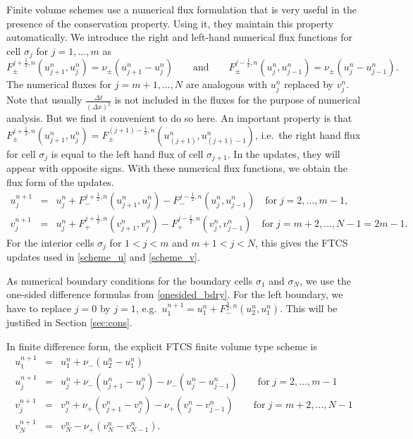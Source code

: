 Finite volume schemes use a numerical flux formulation that is very useful in the presence of the conservation property.
Using it, they maintain this property automatically. We introduce the right and left-hand numerical flux functions for 
cell $\sigma_j$ for $j=1,\ldots,m$ as
%
\begin{equation}
\label{num_flux}
F_\pm^{j+\frac 12,n}(u_{j+1}^n,u_j^n) = \nu_\pm(u_{j+1}^n-u_j^n)\qquad\text{and} 
\qquad F_\pm^{j-\frac 12,n}(u_j^n,u_{j-1}^n) = \nu_\pm(u_j^n-u_{j-1}^n).
\end{equation}
%
The numerical fluxes for $j=m+1,\ldots, N$ are analogous with $u_j^n$ replaced by $v_j^n$.
Note that usually $\frac{\Delta t}{(\Delta x)^2}$ is not included in the fluxes for the purpose of numerical analysis. 
But we find it convenient to do so here. An important property is that $F_\pm^{j+\frac 12,n}(u_{j+1}^n,u_j^n) =
F_\pm^{(j+1)-\frac 12,n}(u_{(j+1)}^n,u_{(j+1)-1}^n)$, i.e.\ the right hand flux for cell $\sigma_j$ is equal to the left hand
flux of cell $\sigma_{j+1}$. In the updates, they will appear with opposite signs. 
With these numerical flux functions, we obtain the flux form of the updates. 
%
\begin{eqnarray*}
u_j^{n+1} &=& u_j^n + F_-^{j+\frac 12,n}(u_{j+1}^n,u_j^n) -F_-^{j-\frac 12,n}(u_j^n,u_{j-1}^n) \quad\text{for}\; j=2,\ldots ,m-1,\\
v_j^{n+1} &=& u_j^n + F_+^{j+\frac 12,n}(v_{j+1}^n,v_j^n) -F_+^{j-\frac 12,n}(v_j^n,v_{j-1}^n) \quad\text{for}\; j=m+2,\ldots ,N-1=2m-1.
\end{eqnarray*}
%
For the interior cells $\sigma_j$ for $1<j<m$ and $m+1<j<N$, this gives the FTCS updates used in \eqref{scheme_u} and \eqref{scheme_v}. 

As numerical boundary conditions for the boundary cells $\sigma_1$ and $\sigma_N$,
we use the one-sided difference formulas from \eqref{onesided_bdry}. For the left boundary, we have to replace $j=0$ by $j=1$, e.g.\ 
$u_1^{n+1} =u_1^n +F_-^{\frac 32,n}(u_2^n,u_1^n)$. This will be justified in Section \ref{sec:cons}. 

In finite difference form, the explicit FTCS finite volume type scheme is
%
\begin{eqnarray}
\label{fvol2}
u^{n+1}_{1}&=&u^n_1+\nu_-( u^n_{2}-u_{1}^{n})\nonumber\\
u^{n+1}_{j}&=&u_j^n+\nu_-( u^n_{j+1}-u_{j}^{n}) -\nu_-(u_j^n- u_{j-1}^{n}) \qquad\mbox{for}\;j=2,...,m-1\nonumber\\
v^{n+1}_{j}&=&v_j^n+\nu_+( v^n_{j+1}-v_{j}^{n}) - \nu_+ (v_j^n-v_{j-1}^{n} )\qquad\mbox{for}\;j=m+2,...,N-1\\
v^{n+1}_{N}&=&v_N^n-\nu_+( v^n_{N}-v_{N-1}^{n}).\nonumber
\end{eqnarray}
%

